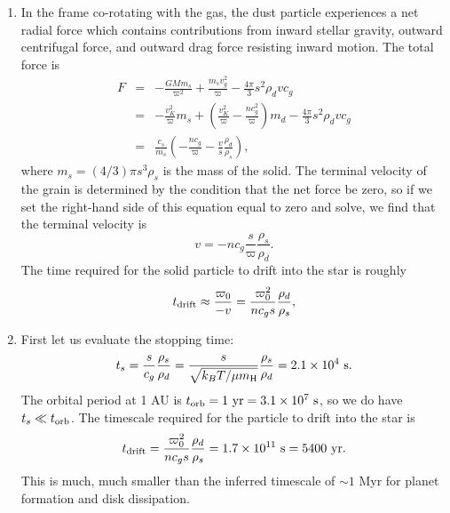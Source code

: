 \begin{enumerate}
\begin{enumerate}
\item In the frame co-rotating with the gas, the dust particle experiences a net radial force which contains contributions from inward stellar gravity, outward centrifugal force, and outward drag force resisting inward motion. The total force is
\begin{eqnarray*}
F & = & -\frac{GM m_s}{\varpi^2} + \frac{m_s v_g^2}{\varpi} - \frac{4\pi}{3} s^2 \rho_d v c_g \\
& = & -\frac{v_K^2}{\varpi} m_s + \left(\frac{v_K^2}{\varpi} - \frac{n c_g^2}{\varpi}\right) m_d - \frac{4\pi}{3} s^2 \rho_d v c_g \\
& = & \frac{c_s}{m_s} \left(-\frac{nc_g}{\varpi} - \frac{v}{s}\frac{\rho_d}{\rho_s}\right),
\end{eqnarray*}
where $m_s = (4/3)\pi s^3 \rho_s$ is the mass of the solid. The terminal velocity of the grain is determined by the condition that the net force be zero, so if we set the right-hand side of this equation equal to zero and solve, we find that the terminal velocity is
\begin{displaymath}
v = -n c_g\frac{s}{\varpi} \frac{\rho_s}{\rho_d}.
\end{displaymath}
The time required for the solid particle to drift into the star is roughly
\begin{displaymath}
t_{\rm drift} \approx \frac{\varpi_0}{-v} = \frac{\varpi_0^2}{n c_g s}\frac{\rho_d}{\rho_s},
\end{displaymath}

\item First let us evaluate the stopping time:
\begin{displaymath}
t_s = \frac{s}{c_g} \frac{\rho_s}{\rho_d} = \frac{s}{\sqrt{k_B T/\mu m_{\rm H}}} \frac{\rho_s}{\rho_d} = 2.1\times 10^4\mbox{ s}.
\end{displaymath}
The orbital period at 1 AU is $t_{\rm orb} = 1\mbox{ yr} = 3.1\times 10^7\mbox{ s}$, so we do have $t_s \ll t_{\rm orb}$. The timescale required for the particle to drift into the star is
\begin{displaymath}
t_{\rm drift} =  \frac{\varpi_0^2}{n c_g s}\frac{\rho_d}{\rho_s} = 1.7\times 10^{11}\mbox{ s} = 5400\mbox{ yr}.
\end{displaymath}
This is much, much smaller than the inferred timescale of $\sim 1$ Myr for planet formation and disk dissipation.

\end{enumerate}

\end{enumerate}



